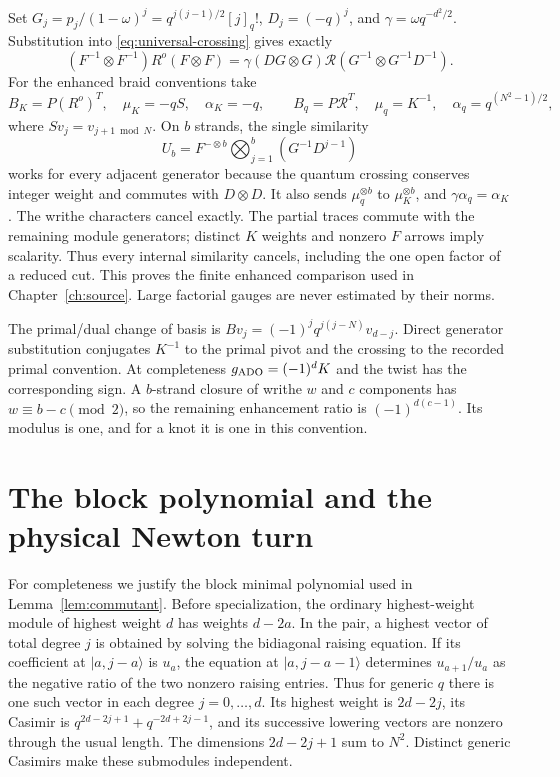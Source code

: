 Set $G_j=p_j/(1-\omega)^j=q^{j(j-1)/2}[j]_q!$, $D_j=(-q)^j$, and $\gamma=\omega q^{-d^2/2}$. Substitution into \eqref{eq:universal-crossing} gives exactly
\[
 (F^{-1}\otimes F^{-1})R^o(F\otimes F)
 =\gamma(DG\otimes G)\mathscr R(G^{-1}\otimes G^{-1}D^{-1}).
\]
For the enhanced braid conventions take
\[
 B_K=P(R^o)^T,\quad\mu_K=-qS,\quad\alpha_K=-q,
 \qquad B_q=P\mathscr R^T,\quad\mu_q=K^{-1},\quad
 \alpha_q=q^{(N^2-1)/2},
\]
where $S v_j=v_{j+1\bmod N}$. On $b$ strands, the single similarity
\[
 U_b=F^{-\otimes b}\bigotimes_{j=1}^b(G^{-1}D^{j-1})
\]
works for every adjacent generator because the quantum crossing conserves integer weight and commutes with $D\otimes D$. It also sends $\mu_q^{\otimes b}$ to $\mu_K^{\otimes b}$, and $\gamma\alpha_q=\alpha_K$. The writhe characters cancel exactly. The partial traces commute with the remaining module generators; distinct $K$ weights and nonzero $F$ arrows imply scalarity. Thus every internal similarity cancels, including the one open factor of a reduced cut. This proves the finite enhanced comparison used in Chapter~\ref{ch:source}. Large factorial gauges are never estimated by their norms.

The primal/dual change of basis is $Bv_j=(-1)^jq^{j(j-N)}v_{d-j}$. Direct generator substitution conjugates $K^{-1}$ to the primal pivot and the crossing to the recorded primal convention. At completeness $g_{\rm ADO}=(-1)^dK$ and the twist has the corresponding sign. A $b$-strand closure of writhe $w$ and $c$ components has $w\equiv b-c\pmod2$, so the remaining enhancement ratio is $(-1)^{d(c-1)}$. Its modulus is one, and for a knot it is one in this convention.

\section{The block polynomial and the physical Newton turn}\label{app:newton}
For completeness we justify the block minimal polynomial used in Lemma~\ref{lem:commutant}. Before specialization, the ordinary highest-weight module of highest weight $d$ has weights $d-2a$. In the pair, a highest vector of total degree $j$ is obtained by solving the bidiagonal raising equation. If its coefficient at $|a,j-a\rangle$ is $u_a$, the equation at $|a,j-a-1\rangle$ determines $u_{a+1}/u_a$ as the negative ratio of the two nonzero raising entries. Thus for generic $q$ there is one such vector in each degree $j=0,\ldots,d$. Its highest weight is $2d-2j$, its Casimir is $q^{2d-2j+1}+q^{-2d+2j-1}$, and its successive lowering vectors are nonzero through the usual length. The dimensions $2d-2j+1$ sum to $N^2$. Distinct generic Casimirs make these submodules independent.

